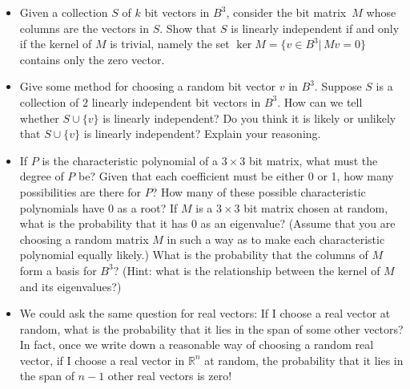 \begin{enumerate}
\begin{itemize}
\item[$i.$] Given a collection $S$ of $k$ bit vectors in $B^3$, consider the bit matrix~$M$ whose columns are the vectors in $S$.  Show that $S$ is linearly independent if and only if the kernel of $M$ is trivial, namely the set $\ker M=\{v\in B^3| \, Mv=0\}$ contains only the zero vector.

\item[$ii.$] Give some method for choosing a random bit vector $v$ in \(B^3\).  Suppose $S$ is a collection of $2$ linearly independent bit vectors in $B^3$.  How can we tell whether $S\cup \{v\}$ is linearly independent?  Do you think it is likely or unlikely that $S\cup \{v\}$ is linearly independent?  Explain your reasoning.

\item[$iii.$] If \(P\) is the characteristic polynomial of a \(3 \times 3\) bit matrix, what must the degree of \(P\) be? Given that each coefficient must be either 0 or 1, how many possibilities are there for \(P\)? How many of these possible characteristic polynomials have 0 as a root? If \(M\) is a \(3 \times 3\) bit matrix chosen at random, what is the probability that it has 0 as an eigenvalue? (Assume that you are choosing a random matrix \(M\) in such a way as to make each characteristic polynomial equally likely.) What is the probability that the columns of \(M\) form a basis for \(B^3\)? (Hint: what is the relationship between the kernel of \(M\) and its eigenvalues?)

\item[Note:] We could ask the same question for real vectors: If I choose a real vector at random, what is the probability that it lies in the span of some other vectors? In fact, once we write down a reasonable way of choosing a random real vector, if I choose a real vector in \(\mathbb{R}^n\) at random, the probability that it lies in the span of \(n-1\) other real vectors is zero! 
\end{itemize}

\end{enumerate}

